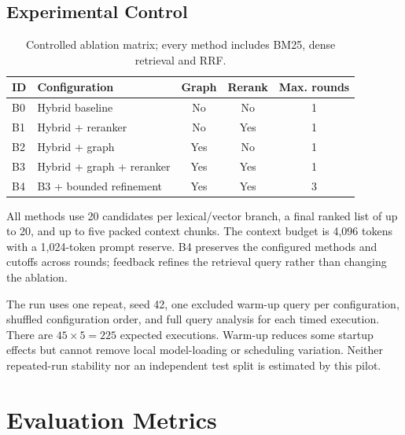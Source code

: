 \documentclass[11pt,a4paper,oneside]{report}
\begin{document}
\subsection{Experimental Control}
\begin{table}[H]\centering\small
\caption{Controlled ablation matrix; every method includes BM25, dense retrieval and RRF.}\label{tab:matrix}
\begin{tabularx}{\textwidth}{lYccc}\toprule
\textbf{ID} & \textbf{Configuration} & \textbf{Graph} & \textbf{Rerank} & \textbf{Max. rounds}\\\midrule
B0 & Hybrid baseline & No & No & 1\\
B1 & Hybrid + reranker & No & Yes & 1\\
B2 & Hybrid + graph & Yes & No & 1\\
B3 & Hybrid + graph + reranker & Yes & Yes & 1\\
B4 & B3 + bounded refinement & Yes & Yes & 3\\\bottomrule
\end{tabularx}
\end{table}
All methods use 20 candidates per lexical/vector branch, a final ranked list of up to 20, and up to five packed context chunks. The context budget is 4,096 tokens with a 1,024-token prompt reserve. B4 preserves the configured methods and cutoffs across rounds; feedback refines the retrieval query rather than changing the ablation.

The run uses one repeat, seed 42, one excluded warm-up query per configuration, shuffled configuration order, and full query analysis for each timed execution. There are $45\times5=225$ expected executions. Warm-up reduces some startup effects but cannot remove local model-loading or scheduling variation. Neither repeated-run stability nor an independent test split is estimated by this pilot.

\section{Evaluation Metrics}
\end{document}
